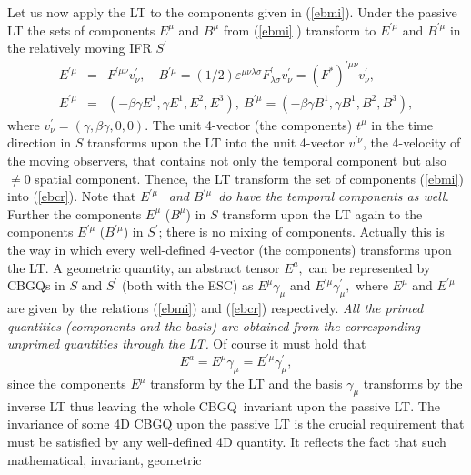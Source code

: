 \documentclass[a4paper,showpacs,preprintnumbers,amsmath,amssymb]{revtex4}
\begin{document}
Let us now apply the LT to the components given in (\ref{ebmi}). Under the
passive LT the sets of components $E^{\mu }$ and $B^{\mu }$ from (\ref{ebmi}%
) transform to $E^{\prime \mu }$ and $B^{\prime \mu }$ in the relatively
moving IFR $S^{\prime }$
\begin{eqnarray}
E^{\prime \mu } &=&F^{\prime \mu \nu }v_{\nu }^{\prime },\quad B^{\prime \mu
}=(1/2)\varepsilon ^{\mu \nu \lambda \sigma }F_{\lambda \sigma }^{\prime
}v_{\nu }^{\prime }=(F^{\ast })^{\prime \mu \nu }v_{\nu }^{\prime },
\nonumber \\
E^{\prime \mu } &=&\left( -\beta \gamma E^{1},\gamma
E^{1},E^{2},E^{3}\right) ,\ B^{\prime \mu }=\left( -\beta \gamma
B^{1},\gamma B^{1},B^{2},B^{3}\right) ,  \label{ebcr}
\end{eqnarray}
where $v_{\nu }^{\prime }=\left( \gamma ,\beta \gamma ,0,0\right) .$ The
unit 4-vector (the components) $t^{\mu }$ in the time direction in $S$
transforms upon the LT into the unit 4-vector $v^{\prime \nu }$, the
4-velocity of the moving observers, that contains not only the temporal
component but also $\neq 0$ spatial component. Thence, the LT transform the
set of components (\ref{ebmi}) into (\ref{ebcr}). Note that $E^{\prime \mu }$%
\emph{\ and }$B^{\prime \mu }$\emph{\ do have the temporal components as
well. }Further the components $E^{\mu }$ ($B^{\mu }$) in $S$ transform upon
the LT again to the components $E^{\prime \mu }$ ($B^{\prime \mu }$) in $%
S^{\prime }$; there is no mixing of components. Actually this is the way in
which every well-defined 4-vector (the components) transforms upon the LT. A
geometric quantity, an abstract tensor $E^{a},$ can be represented by CBGQs
in $S$ and $S^{\prime }$ (both with the ESC) as $E^{\mu }\gamma _{\mu }$ and
$E^{\prime \mu }\gamma _{\mu }^{\prime },$ where $E^{\mu }$ and $E^{\prime
\mu }$ are given by the relations (\ref{ebmi}) and (\ref{ebcr})
respectively. \emph{All the primed quantities (components and the basis) are
obtained from the corresponding unprimed quantities through the LT.} Of
course it must hold that
\begin{equation}
E^{a}=E^{\mu }\gamma _{\mu }=E^{\prime \mu }\gamma _{\mu }^{\prime },
\label{ea}
\end{equation}
since the components $E^{\mu }$ transform by the LT and the basis $\gamma
_{\mu }$ transforms by the inverse LT thus leaving the whole CBGQ\ invariant
upon the passive LT. The invariance of some 4D CBGQ upon the passive LT is
the crucial requirement that must be satisfied by any well-defined 4D
quantity. It reflects the fact that such mathematical, invariant, geometric
\end{document}
